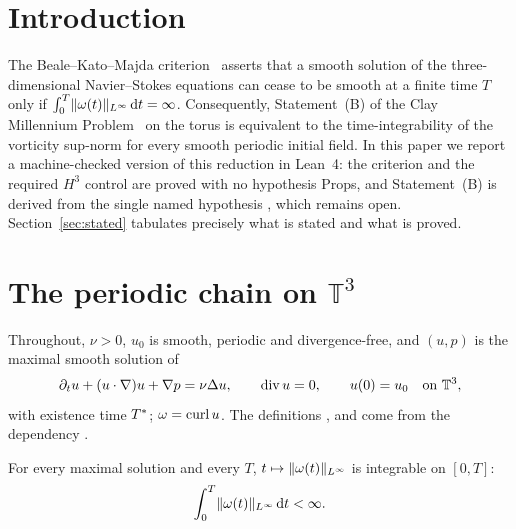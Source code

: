 \documentclass[11pt]{article}
\begin{document}
\section{Introduction}
The Beale--Kato--Majda criterion~\cite{BKM1984} asserts that a smooth solution of the three-dimensional Navier--Stokes equations can cease to be smooth at a finite time $T$ only if $\int_0^T\lVert\omega(t)\rVert_{L^\infty}\,\mathrm{d} t=\infty$. Consequently, Statement~(B) of the Clay Millennium Problem~\cite{Fefferman2000} on the torus is equivalent to the time-integrability of the vorticity sup-norm for every smooth periodic initial field. In this paper we report a machine-checked version of this reduction in Lean~4: the criterion and the required $H^3$ control are proved with no hypothesis Props, and Statement~(B) is derived from the single named hypothesis , which remains open. Section~\ref{sec:stated} tabulates precisely what is stated and what is proved.

\section{\texorpdfstring{The periodic chain on $\mathbb{T}^3$}{The periodic chain on 𝕋³}}
Throughout, $\nu>0$, $u_0$ is smooth, periodic and divergence-free, and $(u,p)$ is the maximal smooth solution of
\begin{equation}\label{eq:ns}
\partial_t u+(u\cdot\nabla)u+\nabla p=\nu\Delta u,\qquad \operatorname{div} u=0,\qquad u(0)=u_0\quad\text{on }\mathbb{T}^3,
\end{equation}
with existence time $T^{*}$; $\omega=\operatorname{curl} u$. The definitions ,  and  come from the dependency .

\begin{hyp}
For every maximal solution and every $T$, $t\mapsto\lVert\omega(t)\rVert_{L^\infty}$ is integrable on $[0,T]$:
\begin{equation}\label{eq:bkmint}\int_0^T\lVert\omega(t)\rVert_{L^\infty}\,\mathrm{d} t<\infty.\end{equation}
\end{hyp}
\end{document}
